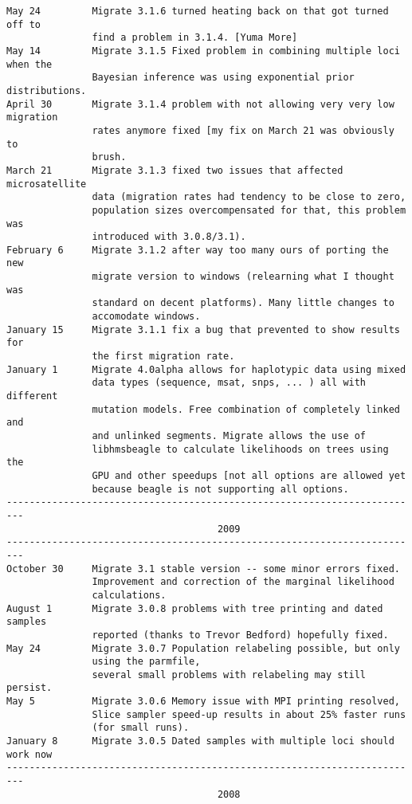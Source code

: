 \begin{small}
\begin{verbatim}
May 24         Migrate 3.1.6 turned heating back on that got turned off to 
               find a problem in 3.1.4. [Yuma More]
May 14         Migrate 3.1.5 Fixed problem in combining multiple loci when the
               Bayesian inference was using exponential prior distributions.
April 30       Migrate 3.1.4 problem with not allowing very very low migration
               rates anymore fixed [my fix on March 21 was obviously to 
               brush.
March 21       Migrate 3.1.3 fixed two issues that affected microsatellite
               data (migration rates had tendency to be close to zero,
               population sizes overcompensated for that, this problem was
               introduced with 3.0.8/3.1).
February 6     Migrate 3.1.2 after way too many ours of porting the new
               migrate version to windows (relearning what I thought was 
               standard on decent platforms). Many little changes to 
               accomodate windows. 
January 15     Migrate 3.1.1 fix a bug that prevented to show results for
               the first migration rate.
January 1      Migrate 4.0alpha allows for haplotypic data using mixed
               data types (sequence, msat, snps, ... ) all with different
               mutation models. Free combination of completely linked and
               and unlinked segments. Migrate allows the use of
               libhmsbeagle to calculate likelihoods on trees using the
               GPU and other speedups [not all options are allowed yet
               because beagle is not supporting all options.
-------------------------------------------------------------------------
                                     2009
-------------------------------------------------------------------------
October 30     Migrate 3.1 stable version -- some minor errors fixed. 
               Improvement and correction of the marginal likelihood 
               calculations.
August 1       Migrate 3.0.8 problems with tree printing and dated samples
               reported (thanks to Trevor Bedford) hopefully fixed. 
May 24         Migrate 3.0.7 Population relabeling possible, but only 
               using the parmfile,
               several small problems with relabeling may still persist.
May 5          Migrate 3.0.6 Memory issue with MPI printing resolved, 
               Slice sampler speed-up results in about 25% faster runs 
               (for small runs). 
January 8      Migrate 3.0.5 Dated samples with multiple loci should work now
-------------------------------------------------------------------------
                                     2008

\end{verbatim}
\end{small}
